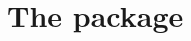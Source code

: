 \documentclass[showtrims]{memoir}
\begin{document}
\part{The  package}
\label{chap:tcltk}



% 


\backmatter
\appendix





\end{document}
